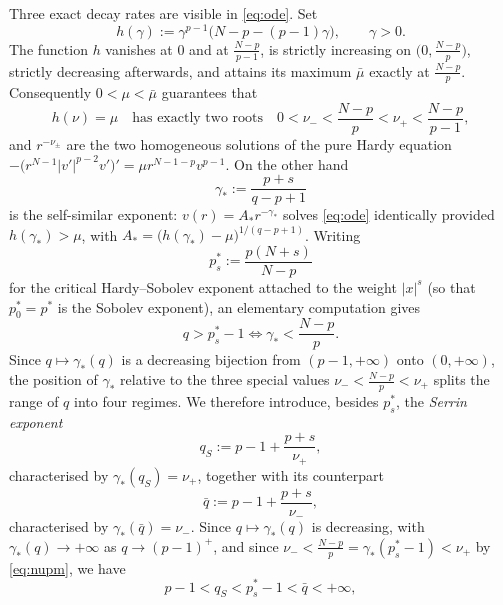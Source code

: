 \documentclass[11pt,reqno]{amsart}
\numberwithin{equation}{section}
\theoremstyle{plain}
\theoremstyle{definition}
\newcommand{\mub}{\bar\mu}
\newcommand{\gs}{\gamma_{*}}
\begin{document}
Three exact decay rates are visible in \eqref{eq:ode}. Set
\begin{equation}\label{eq:hgamma}
h(\gamma):=\gamma^{p-1}\big(N-p-(p-1)\gamma\big),\qquad \gamma>0 .
\end{equation}
The function $h$ vanishes at $0$ and at $\frac{N-p}{p-1}$, is strictly
increasing on $\big(0,\frac{N-p}{p}\big)$, strictly decreasing afterwards, and
attains its maximum $\mub$ exactly at $\frac{N-p}{p}$. Consequently
$0<\mu<\mub$ guarantees that
\begin{equation}\label{eq:nupm}
h(\nu)=\mu\quad\text{has exactly two roots}\quad
0<\nu_{-}<\frac{N-p}{p}<\nu_{+}<\frac{N-p}{p-1},
\end{equation}
and $r^{-\nu_{\pm}}$ are the two homogeneous solutions of the pure Hardy
equation $-\big(r^{N-1}|v'|^{p-2}v'\big)'=\mu r^{N-1-p}v^{p-1}$. On the other
hand
\begin{equation}\label{eq:gstar}
\gs:=\frac{p+s}{q-p+1}
\end{equation}
is the self-similar exponent: $v(r)=A_{*}r^{-\gs}$ solves \eqref{eq:ode}
identically provided $h(\gs)>\mu$, with
$A_{*}=\big(h(\gs)-\mu\big)^{1/(q-p+1)}$. Writing
\begin{equation}\label{eq:pstar}
p^{*}_{s}:=\frac{p(N+s)}{N-p}
\end{equation}
for the critical Hardy--Sobolev exponent attached to the weight $|x|^{s}$
(so that $p^{*}_{0}=p^{*}$ is the Sobolev exponent), an elementary computation
gives
\begin{equation}\label{eq:qsuper}
q>p^{*}_{s}-1\iff \gs<\frac{N-p}{p} .
\end{equation}
Since $q\mapsto\gs(q)$ is a decreasing bijection from $(p-1,+\infty)$ onto
$(0,+\infty)$, the position of $\gs$ relative to the three special values
$\nu_{-}<\frac{N-p}{p}<\nu_{+}$ splits the range of $q$ into four regimes. We
therefore introduce, besides $p^{*}_{s}$, the \emph{Serrin exponent}
\begin{equation}\label{eq:qS}
q_{S}:=p-1+\frac{p+s}{\nu_{+}} ,
\end{equation}
characterised by $\gs(q_{S})=\nu_{+}$, together with its counterpart
\begin{equation}\label{eq:qbar}
\bar q:=p-1+\frac{p+s}{\nu_{-}} ,
\end{equation}
characterised by $\gs(\bar q)=\nu_{-}$. Since $q\mapsto\gs(q)$ is decreasing,
with $\gs(q)\to+\infty$ as $q\to(p-1)^{+}$, and since
$\nu_{-}<\frac{N-p}{p}=\gs(p^{*}_{s}-1)<\nu_{+}$ by \eqref{eq:nupm}, we have
\[
p-1<q_{S}<p^{*}_{s}-1<\bar q<+\infty ,
\]
\end{document}
